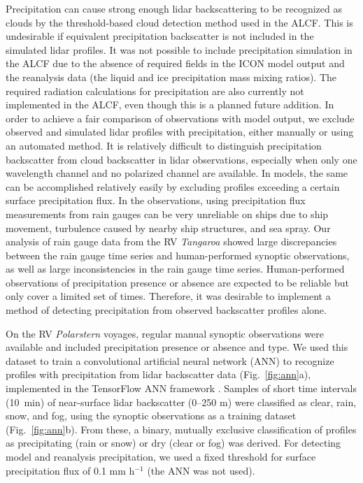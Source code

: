 \documentclass[draft]{agujournal2019}
\begin{document}
Precipitation can cause strong enough lidar backscattering to be recognized as clouds by the threshold-based cloud detection method used in the ALCF. This is undesirable if equivalent precipitation backscatter is not included in the simulated lidar profiles. It was not possible to include precipitation simulation in the ALCF due to the absence of required fields in the ICON model output and the reanalysis data (the liquid and ice precipitation mass mixing ratios). The required radiation calculations for precipitation are also currently not implemented in the ALCF, even though this is a planned future addition. In order to achieve a fair comparison of observations with model output, we exclude observed and simulated lidar profiles with precipitation, either manually or using an automated method. It is relatively difficult to distinguish precipitation backscatter from cloud backscatter in lidar observations, especially when only one wavelength channel and no polarized channel are available. In models, the same can be accomplished relatively easily by excluding profiles exceeding a certain surface precipitation flux. In the observations, using precipitation flux measurements from rain gauges can be very unreliable on ships due to ship movement, turbulence caused by nearby ship structures, and sea spray. Our analysis of rain gauge data from the RV \emph{Tangaroa} showed large discrepancies between the rain gauge time series and human-performed synoptic observations, as well as large inconsistencies in the rain gauge time series. Human-performed observations of precipitation presence or absence are expected to be reliable but only cover a limited set of times. Therefore, it was desirable to implement a method of detecting precipitation from observed backscatter profiles alone.

On the RV \emph{Polarstern} voyages, regular manual synoptic observations were available and included precipitation presence or absence and type. We used this dataset to train a convolutional artificial neural network (ANN) to recognize profiles with precipitation from lidar backscatter data (Fig.~\ref{fig:ann}a), implemented in the TensorFlow ANN framework \cite{tensorflow}. Samples of short time intervals (10~min) of near-surface lidar backscatter (0–250 m) were classified as clear, rain, snow, and fog, using the synoptic observations as a training dataset (Fig.~\ref{fig:ann}b). From these, a binary, mutually exclusive classification of profiles as precipitating (rain or snow) or dry (clear or fog) was derived. For detecting model and reanalysis precipitation, we used a fixed threshold for surface precipitation flux of 0.1 mm h$^{-1}$ (the ANN was not used).
\end{document}
